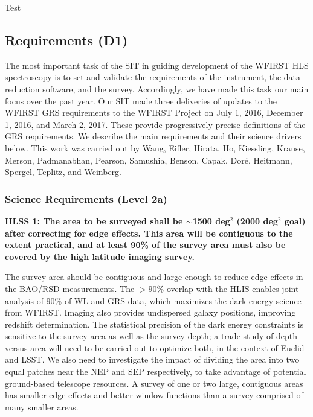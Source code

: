 

\begin{tcolorbox}[width=\textwidth,colback={red},title={With true corners},outer arc=0mm,colupper=white]
     Test
\end{tcolorbox}


 \subsection{Requirements (D1)}

 The most important task of the SIT in guiding development of the WFIRST HLS
 spectroscopy is to set and validate the requirements of the instrument, the data
 reduction software, and the survey.  Accordingly, we have made this task our main focus
 over the past year. Our SIT made three deliveries of updates to
 the WFIRST GRS requirements to the WFIRST Project on July 1, 2016, December 1,
 2016, and March 2, 2017. These provide progressively precise definitions of the
 GRS requirements. We describe the main requirements and their science drivers
 below. This work was carried out by Wang, Eifler, Hirata, Ho, Kiessling, Krause, Merson, Padmanabhan, Pearson, Samushia,
 Benson, Capak, Dor\'e, Heitmann, Spergel, Teplitz, and Weinberg.

 \subsubsection{Science Requirements (Level 2a)}

 \noindent
 {\bf HLSS 1: The area to be surveyed shall be $\sim$1500 deg$^2$ (2000 deg$^2$ goal) after
 correcting for edge effects.  This area will be contiguous to the extent
 practical, and at least 90\% of the survey area must also be covered by the high
 latitude imaging survey. }

 The survey area should be contiguous and large enough to reduce edge effects in
 the BAO/RSD measurements.  The $>90\%$ overlap with the HLIS enables joint
 analysis of 90\% of WL and GRS data, which maximizes the dark energy science
 from WFIRST.  Imaging also provides undispersed galaxy positions, improving
 redshift determination.  The statistical precision of the dark energy
 constraints is sensitive to the survey area as well as the survey depth; a trade
 study of depth versus area will need to be carried out to optimize both, in the
 context of Euclid and LSST. We also need to investigate the impact of dividing
 the area into two equal patches near the NEP and SEP respectively, to take
 advantage of potential ground-based telescope resources.  A survey of one or
 two large, contiguous areas has smaller edge effects and better window functions
 than a survey comprised of many smaller areas.

